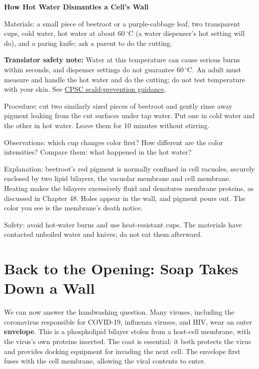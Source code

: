 \begin{shiyan}
\textbf{How Hot Water Dismantles a Cell's Wall}

Materials: a small piece of beetroot or a purple-cabbage leaf, two transparent cups, cold water, hot water at about $60\,^{\circ}\mathrm{C}$ (a water dispenser's hot setting will do), and a paring knife; ask a parent to do the cutting.

\textbf{Translator safety note:} Water at this temperature can cause serious burns within seconds, and dispenser settings do not guarantee $60\,^{\circ}\mathrm{C}$. An adult must measure and handle the hot water and do the cutting; do not test temperature with your skin. See \href{https://www.cpsc.gov/s3fs-public/5098.pdf}{CPSC scald-prevention guidance}.

Procedure: cut two similarly sized pieces of beetroot and gently rinse away pigment leaking from the cut surfaces under tap water. Put one in cold water and the other in hot water. Leave them for 10 minutes without stirring.

Observations: which cup changes color first? How different are the color intensities? Compare them: what happened in the hot water?

Explanation: beetroot's red pigment is normally confined in cell vacuoles, securely enclosed by two lipid bilayers, the vacuolar membrane and cell membrane. Heating makes the bilayers excessively fluid and denatures membrane proteins, as discussed in Chapter 48. Holes appear in the wall, and pigment pours out. The color you see is the membrane's death notice.

Safety: avoid hot-water burns and use heat-resistant cups. The materials have contacted unboiled water and knives; do not eat them afterward.
\end{shiyan}

\section{Back to the Opening: Soap Takes Down a Wall}

We can now answer the handwashing question. Many viruses, including the coronavirus responsible for COVID-19, influenza viruses, and HIV, wear an outer \textbf{envelope}. This is a phospholipid bilayer stolen from a host-cell membrane, with the virus's own proteins inserted. The coat is essential: it both protects the virus and provides docking equipment for invading the next cell. The envelope first fuses with the cell membrane, allowing the viral contents to enter.

